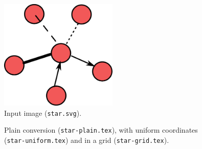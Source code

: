 \begin{figure}[H]
\centering
\includegraphics[width=0.5\textwidth]{star.pdf}
\caption{Input image (\texttt{star.svg}).}
\end{figure}

\begin{figure}[H]
\begin{minipage}{0.3\textwidth}
\begin{tikzpicture}

\end{tikzpicture}
\end{minipage}
\begin{minipage}{0.3\textwidth}
\begin{tikzpicture}

\end{tikzpicture}
\end{minipage}
\begin{minipage}{0.3\textwidth}
\begin{tikzpicture}

\end{tikzpicture}
\end{minipage}
\caption{Plain conversion (\texttt{star-plain.tex}), with uniform coordinates (\texttt{star-uniform.tex}) and in a grid (\texttt{star-grid.tex}).}
\end{figure}
